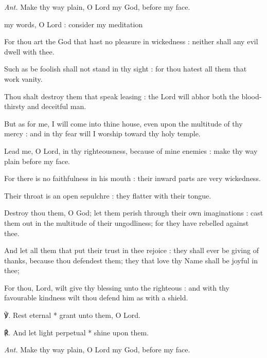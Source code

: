 \par\noindent
\textit{Ant.} Make thy way plain, {\dag} O Lord my God, before my face.\par
{} my words, O Lord : consider my meditation\par
{}
For thou art the God that hast no pleasure in wickedness : neither shall any evil dwell with thee.\par
{}Such as be foolish shall not stand in thy sight : for thou hatest all them that work vanity.\par
{}Thou shalt destroy them that speak leasing : the Lord will abhor both the blood-thirsty and deceitful man.\par
{}But as for me, I will come into thine house, even upon the multitude of thy mercy : and in thy fear will I worship toward thy holy temple.\par
{}Lead me, O Lord, in thy righteousness, because of mine enemies : make thy way plain before my face.\par
{}For there is no faithfulness in his mouth : their inward parts are very wickedness.\par
{}Their throat is an open sepulchre : they flatter with their tongue.\par
{}Destroy thou them, O God; let them perish through their own imaginations : cast them out in the multitude of their ungodliness; for they have rebelled against thee.\par
{}And let all them that put their trust in thee rejoice : they shall ever be giving of thanks, because thou defendest them; they that love thy Name shall be joyful in thee;\par
{}For thou, Lord, wilt give thy blessing unto the righteous : and with thy favourable kindness wilt thou defend him as with a shield.\par
℣. Rest eternal * grant unto them, O Lord.\par
℟. And let light perpetual * shine upon them.\par\noindent
\textit{Ant.} Make thy way plain, O Lord my God, before my face.\par
{}\par\noindent
